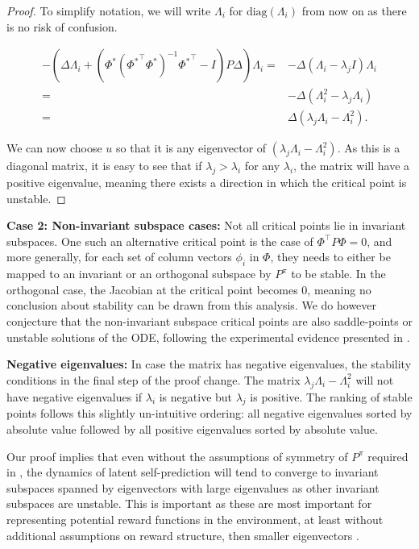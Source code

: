 \begin{proof}
To simplify notation, we will write $\Lambda_i$ for $\mathrm{diag}(\Lambda_i)$ from now on as there is no risk of confusion.

\begin{align}
    -\left(\Delta \Lambda_i + \left(\Phi^*\left({\Phi^*}^\top \Phi^*\right)^{-1}{\Phi^*}^\top - I\right) P \Delta\right)\Lambda_i = &- \Delta \left(\Lambda_i - \lambda_j I\right) \Lambda_i\\
    = &-\Delta \left(\Lambda_i^2 - \lambda_j \Lambda_i\right) \\
    = &\Delta \left(\lambda_j \Lambda_i - \Lambda_i^2\right).
\end{align}

We can now choose $u$ so that it is any eigenvector of $\left(\lambda_j \Lambda_i - \Lambda_i^2\right)$. As this is a diagonal matrix, it is easy to see that if $\lambda_j > \lambda_i$ for any $\lambda_i$, the matrix will have a positive eigenvalue, meaning there exists a direction in which the critical point is unstable.
\end{proof}

\textbf{Case 2: Non-invariant subspace cases:} Not all critical points lie in invariant subspaces.
One such an alternative critical point is the case of $\Phi^\top P \Phi = 0$, and more generally, for each set of column vectors $\phi_i$ in $\Phi$, they needs to either be mapped to an invariant or an orthogonal subspace by $P^\pi$ to be stable.
In the orthogonal case, the Jacobian at the critical point becomes 0, meaning no conclusion about stability can be drawn from this analysis.
We do however conjecture that the non-invariant subspace critical points are also saddle-points or unstable solutions of the ODE, following the experimental evidence presented in \textcite{tang2022understanding}.

\textbf{Negative eigenvalues:} In case the matrix has negative eigenvalues, the stability conditions in the final step of the proof change. The matrix $\lambda_j\Lambda_i - \Lambda_i^2$ will not have negative eigenvalues if $\lambda_i$ is negative but $\lambda_j$ is positive. The ranking of stable points follows this slightly un-intuitive ordering: all negative eigenvalues sorted by absolute value followed by all positive eigenvalues sorted by absolute value.



Our proof implies that even without the assumptions of symmetry of $P^\pi$ required in \textcite{tang2022understanding}, the dynamics of latent self-prediction will tend to converge to invariant subspaces spanned by eigenvectors with large eigenvalues as other invariant subspaces are unstable.
This is important as these are most important for representing potential reward functions in the environment, at least without additional assumptions on reward structure, then smaller eigenvectors \parencite{lelan2023bootstrapped}. 

